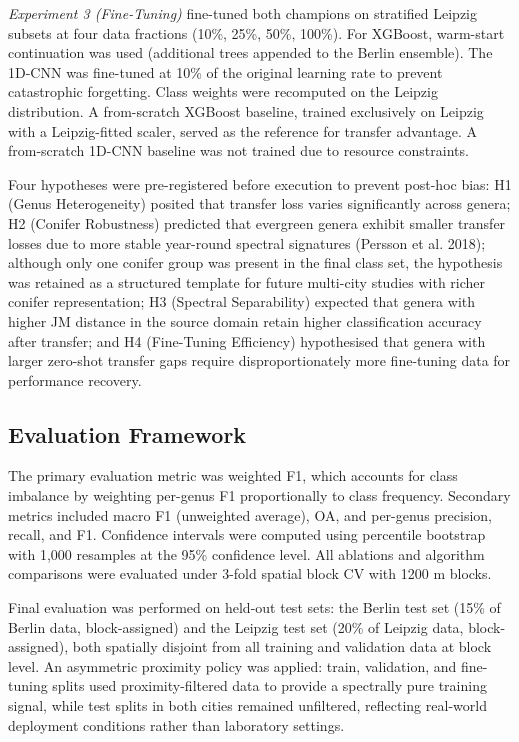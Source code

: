 \documentclass[11pt,a4paper]{scrartcl}
\begin{document}
\emph{Experiment 3 (Fine-Tuning)} fine-tuned both champions on
stratified Leipzig subsets at four data fractions (10\%, 25\%, 50\%,
100\%). For XGBoost, warm-start continuation was used (additional trees
appended to the Berlin ensemble). The 1D-CNN was fine-tuned at 10\% of
the original learning rate to prevent catastrophic forgetting. Class
weights were recomputed on the Leipzig distribution. A from-scratch
XGBoost baseline, trained exclusively on Leipzig with a Leipzig-fitted
scaler, served as the reference for transfer advantage. A from-scratch
1D-CNN baseline was not trained due to resource constraints.

Four hypotheses were pre-registered before execution to prevent post-hoc
bias: H1 (Genus Heterogeneity) posited that transfer loss varies
significantly across genera; H2 (Conifer Robustness) predicted that
evergreen genera exhibit smaller transfer losses due to more stable
year-round spectral signatures (Persson et al. 2018); although only one
conifer group was present in the final class set, the hypothesis was
retained as a structured template for future multi-city studies with
richer conifer representation; H3 (Spectral Separability) expected that
genera with higher JM distance in the source domain retain higher
classification accuracy after transfer; and H4 (Fine-Tuning Efficiency)
hypothesised that genera with larger zero-shot transfer gaps require
disproportionately more fine-tuning data for performance recovery.

\subsection{Evaluation Framework}\label{evaluation-framework}

The primary evaluation metric was weighted F1, which accounts for class
imbalance by weighting per-genus F1 proportionally to class frequency.
Secondary metrics included macro F1 (unweighted average), OA, and
per-genus precision, recall, and F1. Confidence intervals were computed
using percentile bootstrap with 1,000 resamples at the 95\% confidence
level. All ablations and algorithm comparisons were evaluated under
3-fold spatial block CV with 1200 m blocks.

Final evaluation was performed on held-out test sets: the Berlin test
set (15\% of Berlin data, block-assigned) and the Leipzig test set (20\%
of Leipzig data, block-assigned), both spatially disjoint from all
training and validation data at block level. An asymmetric proximity
policy was applied: train, validation, and fine-tuning splits used
proximity-filtered data to provide a spectrally pure training signal,
while test splits in both cities remained unfiltered, reflecting
real-world deployment conditions rather than laboratory settings.
\end{document}

